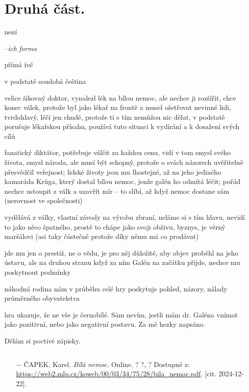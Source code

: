 \documentclass{article}
\begin{document}
\section{Druhá část.}
\begin{description}
    \setlength\itemsep{0.15em}
    \item[vypravěč:] není
    \item[vyprávěcí způsoby:] \textit{--ich forma}
    \item[typy promluv:] přímá řeč
    \item[jazyková stránka:] v podstatě soudobá čeština
    \item[postavy:]
        \begin{description}
            \setlength\itemsep{0.15em}
           	\item[dr. Galén,] velice šikovný doktor, vynalezl lék na bílou nemoc, ale nechce ji rozšířit, chce konec válek,
                protože byl jako lékař na frontě a musel ošetřovat nevinné lidi, tvrdohlavý, léčí jen chudé, protože
                ti s tím nemůžou nic dělat, v podstatě porušuje lékařskou přísahu, používá tuto situaci k vydírání a k
                dosažení svých cílů
            \item[Maršál,] fanatický diktátor, potřebuje válčit za každou cenu, vidí v tom smysl svého života, smysl národa,
                ale musí být schopný, protože o svách názorech uvěřitelně přesvědčil veřejnost; lidské životy jsou mu lhostejné,
                až na jeho jediného kamaráda Krüga, který dostal bílou nemoc, jenže galén ho odmítá léčit; pořád nechce
                ustoupit z válk a uzavřít mír -- to slíbí, až když nemoc dostane sám (nerovnost ve společnosti)
            \item[Krüg] vydělává z války, vlastní závody na výrobu zbraní, neláme si s tím hlavu, nevidí to jako něco špatného,
                prostě to chápe jako svoji obživu, byznys, je věrný maršálovi (asi taky částečně protože díky němu má co prodávat)
           	\item[profesor Sigelius] jde mu jen o prestiž, ne o vědu, je pro něj důležité, aby objev proběhl na jeho ústavu,
                ale na druhou stranu když za ním Galén na začátku přijde, nechce mu poskytnout podmínky
            \item[rodina] náhodná rodina nám v průběhu celé hry poskytuje pohled, názory, nálady průměrného obyvatelstva
        \end{description}
    \item[názor:] hra ukazuje, že ne vše je černobílé. Sám nevím, jestli mám dr. Galéna vnímat jako pozitivní,
    nebo jako negativní postavu. Za mě hezky napsáno.
    \item[kontext:]  Dělám si poctivé zápisky.
    \item[zdroje:] $ $
    \begin{itemize}
        \setlength\itemsep{0em}
        \item[$-$] ČAPEK, Karel. \textit{Bílá nemoc.} Online. ? ?, ? Dostupné z: \url{https://web2.mlp.cz/koweb/00/03/34/75/28/bila_nemoc.pdf}. [cit. 2024-12-22].
    \end{itemize}
\end{description}
\end{document}
